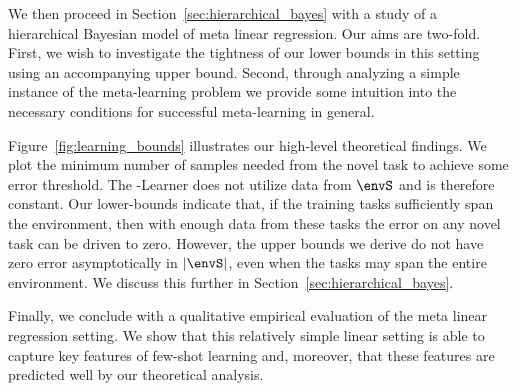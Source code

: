 We then proceed in Section~\ref{sec:hierarchical_bayes} with a study of a hierarchical Bayesian model of meta linear regression. Our aims are two-fold. First, we wish to investigate the tightness of our lower bounds in this setting using an accompanying upper bound. Second, through analyzing a simple instance of the meta-learning problem we provide some intuition into the necessary conditions for successful meta-learning in general.

Figure~\ref{fig:learning_bounds} illustrates our high-level theoretical findings. We plot the minimum number of samples needed from the novel task to achieve some error threshold. The \iid-Learner does not utilize data from $\envS$ and is therefore constant. Our lower-bounds indicate that, if the training tasks sufficiently span the environment, then with enough data from these tasks the error on any novel task can be driven to zero. However, the upper bounds we derive do not have zero error asymptotically in $|\envS|$, even when the tasks may span the entire environment. We discuss this further in Section~\ref{sec:hierarchical_bayes}.

Finally, we conclude with a qualitative empirical evaluation of the meta linear regression setting. We show that this relatively simple linear setting is able to capture key features of few-shot learning and, moreover, that these features are predicted well by our theoretical analysis.